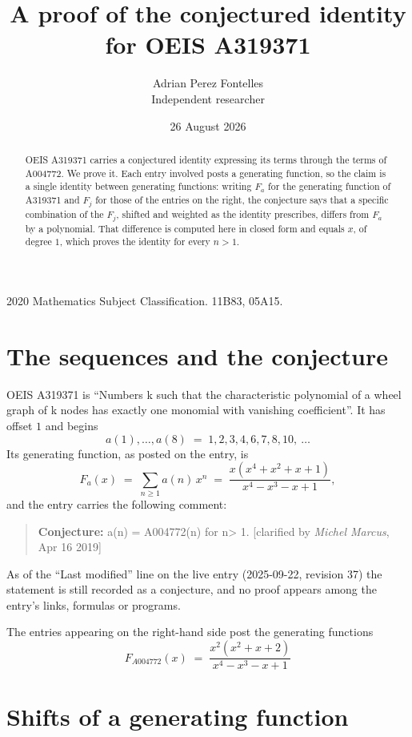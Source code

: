 \documentclass[11pt,a4paper]{article}
\title{A proof of the conjectured identity for OEIS A319371}
\author{Adrian Perez Fontelles\\ \small Independent researcher}
\date{26 August 2026}
\theoremstyle{plain}
\theoremstyle{definition}
\begin{document}
\maketitle

\begin{abstract}
OEIS A319371 carries a conjectured identity expressing its terms through the terms of
A004772. We prove it. Each entry involved posts a generating function, so the claim is
a single identity between generating functions: writing $F_{a}$ for the generating
function of A319371 and $F_{j}$ for those of the entries on the right, the conjecture
says that a specific combination of the $F_{j}$, shifted and weighted as the identity
prescribes, differs from $F_{a}$ by a polynomial. That difference is computed here in
closed form and equals $x$, of degree $1$, which proves the identity for
every $n>1$.
\end{abstract}

\noindent\small 2020 Mathematics Subject Classification. 11B83, 05A15.\normalsize

\section{The sequences and the conjecture}

OEIS A319371 is ``Numbers k such that the characteristic polynomial of a wheel graph of k nodes has exactly one monomial with vanishing coefficient''. It has offset $1$ and begins
\[
a(1),\dots,a(8)\;=\;1, 2, 3, 4, 6, 7, 8, 10,\ \dots
\]
Its generating function, as posted on the entry, is
\begin{equation}\label{eq:gf}
F_{a}(x)\;=\;\sum_{n\ge 1} a(n)\,x^{n}\;=\;\frac{x \left(x^{4} + x^{2} + x + 1\right)}{x^{4} - x^{3} - x + 1} ,
\end{equation}
and the entry carries the following comment:
\begin{quote}\small
\textbf{Conjecture:} a(n) = A004772(n) for n> 1. [clarified by \emph{Michel Marcus}, Apr 16 2019]
\end{quote}
As of the ``Last modified'' line on the live entry (2025-09-22, revision 37) the
statement is still recorded as a conjecture, and no proof appears among the entry's links,
formulas or programs.

The entries appearing on the right-hand side post the generating functions
\[
F_{A004772}(x) \;=\; \frac{x^{2} \left(x^{2} + x + 2\right)}{x^{4} - x^{3} - x + 1}
\]

\section{Shifts of a generating function}
\end{document}
